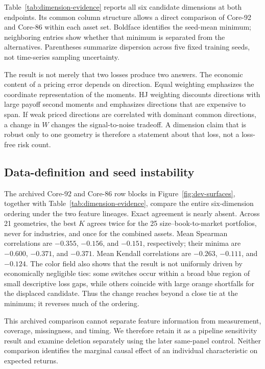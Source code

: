 Table~\ref{tab:dimension-evidence} reports all six candidate dimensions at both endpoints. Its common column structure allows a direct comparison of Core-92 and Core-86 within each asset set. Boldface identifies the seed-mean minimum; neighboring entries show whether that minimum is separated from the alternatives. Parentheses summarize dispersion across five fixed training seeds, not time-series sampling uncertainty.



The result is not merely that two losses produce two answers. The economic content of a pricing error depends on direction. Equal weighting emphasizes the coordinate representation of the moments. HJ weighting discounts directions with large payoff second moments and emphasizes directions that are expensive to span. If weak priced directions are correlated with dominant common directions, a change in $W$ changes the signal-to-noise tradeoff. A dimension claim that is robust only to one geometry is therefore a statement about that loss, not a loss-free risk count.

\subsection{Data-definition and seed instability}

The archived Core-92 and Core-86 row blocks in Figure~\ref{fig:dev-surfaces}, together with Table~\ref{tab:dimension-evidence}, compare the entire six-dimension ordering under the two feature lineages. Exact agreement is nearly absent. Across 21 geometries, the best $K$ agrees twice for the 25 size--book-to-market portfolios, never for industries, and once for the combined assets. Mean Spearman correlations are $-0.355$, $-0.156$, and $-0.151$, respectively; their minima are $-0.600$, $-0.371$, and $-0.371$. Mean Kendall correlations are $-0.263$, $-0.111$, and $-0.124$. The color field also shows that the result is not uniformly driven by economically negligible ties: some switches occur within a broad blue region of small descriptive loss gaps, while others coincide with large orange shortfalls for the displaced candidate. Thus the change reaches beyond a close tie at the minimum; it reverses much of the ordering.

This archived comparison cannot separate feature information from measurement, coverage, missingness, and timing. We therefore retain it as a pipeline sensitivity result and examine deletion separately using the later same-panel control. Neither comparison identifies the marginal causal effect of an individual characteristic on expected returns.

